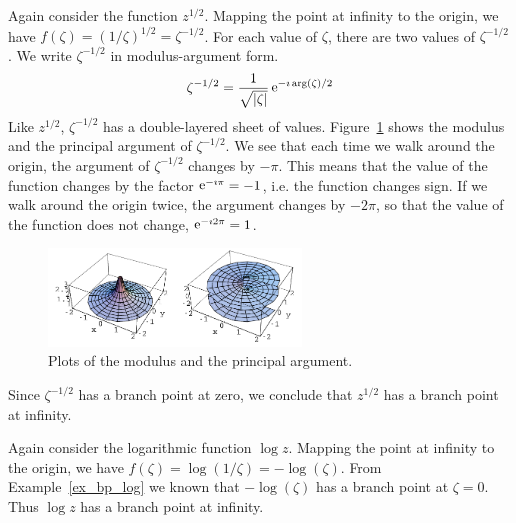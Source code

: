 \begin{Example}
  Again consider the function $z^{1/2}$.  Mapping the point at infinity to
  the origin, we have $f(\zeta) = (1/\zeta)^{1/2} = \zeta^{-1/2}$.
  For each value of $\zeta$, there are two values of $\zeta^{-1/2}$.  
  We write $\zeta^{-1/2}$ in modulus-argument form.
  \[
  \zeta^{-1/2} = \frac{ 1 }{ \sqrt{|\zeta|} } \mathop{\mathrm{e}}\nolimits^{- \imath \arg(\zeta) / 2} 
  \]
  Like $z^{1/2}$, $\zeta^{-1/2}$ has a double-layered sheet of values.
  Figure~\ref{zeta_m12_ma} shows the modulus and the principal argument of 
  $\zeta^{-1/2}$.  We see that each time we walk around the origin, the argument
  of $\zeta^{-1/2}$ changes by $-\pi$.  This means that the value of the 
  function changes by the factor $\mathop{\mathrm{e}}\nolimits^{-\imath \pi} = -1$, i.e. the function changes 
  sign.  If we walk around the origin twice, the argument
  changes by $-2 \pi$, so that the value of the function does not change,
  $\mathop{\mathrm{e}}\nolimits^{-\imath 2 \pi} = 1$.

  \begin{figure}[htbp!]
    \begin{center}
      \includegraphics[width=0.6\textwidth]{fcv/function/zeta_m12_ma}
    \end{center}
    \caption{Plots of the modulus and the principal argument.}
    \label{zeta_m12_ma}
  \end{figure}

  Since $\zeta^{-1/2}$ has a branch point at zero, we conclude that $z^{1/2}$
  has a branch point at infinity.
\end{Example}









\begin{Example}
  Again consider the logarithmic function $\log z$.  Mapping the point at 
  infinity to the origin, we have $f(\zeta) = \log(1/\zeta) = - \log(\zeta)$.
  From Example~\ref{ex_bp_log} we known that $- \log(\zeta)$ has a branch
  point at $\zeta = 0$.  Thus $\log z$ has a branch point at infinity.
\end{Example}








